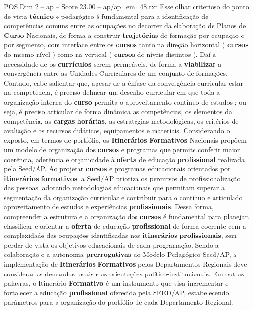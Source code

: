 \begin{textsample}{POS Dim 2 – ap – Score 23.00 – ap/ap\_em\_48.txt}
Esse olhar criterioso do ponto de vista \textbf{técnico} e pedagógico é fundamental para a identificação de competências comuns entre as ocupações no decorrer da elaboração de Planos de \textbf{Curso} Nacionais, de forma a construir \textbf{trajetórias} de formação por ocupação e por segmento, com interface entre os \textbf{cursos} tanto na direção horizontal ( \textbf{cursos} do mesmo nível ) como na vertical ( \textbf{cursos} de níveis distintos ).
Daí a necessidade de os \textbf{currículos} serem permeáveis, de forma a \textbf{viabilizar} a convergência entre as Unidades Curriculares de um conjunto de formações.
Contudo, cabe salientar que, apesar de a ênfase da convergência curricular estar na competência, é preciso delinear um desenho curricular em que toda a organização interna do \textbf{curso} permita o aproveitamento contínuo de estudos ; ou seja, é preciso articular de forma dinâmica as competências, os elementos da competência, as \textbf{cargas} \textbf{horárias}, as estratégias metodológicas, os critérios de avaliação e os recursos didáticos, equipamentos e materiais.
Considerando o exposto, em termos de portfólio, os \textbf{Itinerários} \textbf{Formativos} Nacionais propõem um modelo de organização dos \textbf{cursos} e programas que permite conferir maior coerência, aderência e organicidade à \textbf{oferta} de educação \textbf{profissional} realizada pela Seed/AP.
Ao projetar \textbf{cursos} e programas educacionais orientados por \textbf{itinerários} \textbf{formativos}, a Seed/AP prioriza os percursos de profissionalização das pessoas, adotando metodologias educacionais que permitam superar a segmentação da organização curricular e contribuir para o contínuo e articulado aproveitamento de estudos e experiências \textbf{profissionais}.
Dessa forma, compreender a estrutura e a organização dos \textbf{cursos} é fundamental para planejar, classificar e orientar a \textbf{oferta} de educação \textbf{profissional} de forma coerente com a complexidade das ocupações identificadas nos \textbf{itinerários} \textbf{profissionais}, sem perder de vista os objetivos educacionais de cada programação.
Sendo a colaboração e a autonomia \textbf{prerrogativas} do Modelo Pedagógico Seed/AP, a implementação de \textbf{Itinerários} \textbf{Formativos} pelos Departamentos Regionais deve considerar as demandas locais e as orientações político-institucionais.
Em outras palavras, o Itinerário \textbf{Formativo} é um instrumento que visa incrementar e fortalecer a educação \textbf{profissional} oferecida pela SEED/AP, estabelecendo parâmetros para a organização do portfólio de cada Departamento Regional.

\end{textsample}
